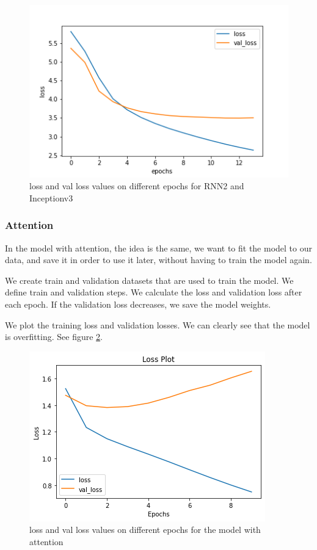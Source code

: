 \documentclass{article} %
\begin{document}
\begin{figure}[ht]
\centering
\includegraphics[scale=0.5]{rnn_2_inceptionv3_loss.png}
\caption{loss and val loss values on different epochs for RNN2 and Inceptionv3}
\label{lossgraph}
\end{figure}

\subsubsection{Attention}

In the model with attention, the idea is the same, we want to fit the model to our data, and save it in order to use it later, without having to train the model again.

We create train and validation datasets that are used to train the model. We define train and validation steps. We calculate the loss and validation loss after each epoch. If the validation loss decreases, we save the model weights.

We plot the training loss and validation losses. We can clearly see that the model is overfitting. See figure \ref{attlossgraph}.

\begin{figure}[ht]
\centering
\includegraphics[scale=0.5]{attentionlosses.png}
\caption{loss and val loss values on different epochs for the model with attention}
\label{attlossgraph}
\end{figure}
\end{document}
